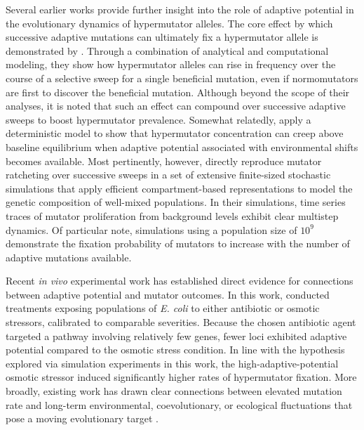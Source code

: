 Several earlier works provide further insight into the role of adaptive potential in the evolutionary dynamics of hypermutator alleles.
The core effect by which successive adaptive mutations can ultimately fix a hypermutator allele is demonstrated by \citet{tanaka2003evolution}.
Through a combination of analytical and computational modeling, they show how hypermutator alleles can rise in frequency over the course of a selective sweep for a single beneficial mutation, even if normomutators are first to discover the beneficial mutation.
Although beyond the scope of their analyses, it is noted that such an effect can compound over successive adaptive sweeps to boost hypermutator prevalence.
Somewhat relatedly, \citet{travis2002mutator} apply a deterministic model to show that hypermutator concentration can creep above baseline equilibrium when adaptive potential associated with environmental shifts becomes available.
Most pertinently, however, \citet{tenaillon1999mutators} directly reproduce mutator ratcheting over successive sweeps in a set of extensive finite-sized stochastic simulations that apply efficient compartment-based representations to model the genetic composition of well-mixed populations.
In their simulations, time series traces of mutator proliferation from background levels exhibit clear multistep dynamics.
Of particular note, simulations using a population size of $10^9$ demonstrate the fixation probability of mutators to increase with the number of adaptive mutations available.

Recent \textit{in vivo} experimental work has established direct evidence for connections between adaptive potential and mutator outcomes.
In this work, \citet{callens2023hypermutator} conducted treatments exposing populations of \textit{E. coli} to either antibiotic or osmotic stressors, calibrated to comparable severities.
Because the chosen antibiotic agent targeted a pathway involving relatively few genes, fewer loci exhibited adaptive potential compared to the osmotic stress condition.
In line with the hypothesis explored via simulation experiments in this work, the high-adaptive-potential osmotic stressor induced significantly higher rates of hypermutator fixation.
More broadly, existing work has drawn clear connections between elevated mutation rate and long-term environmental, coevolutionary, or ecological fluctuations that pose a moving evolutionary target \citep{leigh1970natural,travis2002mutator,travis2004mutators,rosenbloom2014frequencydependent,pal2007coevolution,wei2022rapid}.


